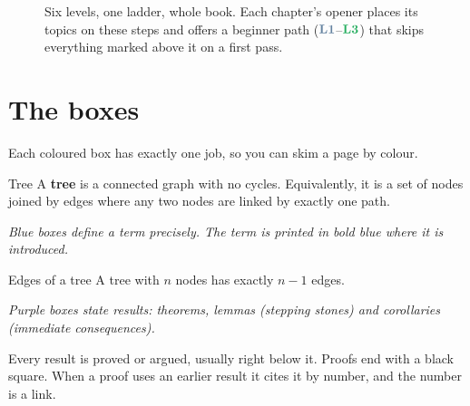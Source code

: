 \begin{figure}[H]
\centering
{}
\caption*{Six levels, one ladder, whole book. Each chapter's opener places its
topics on these steps and offers a beginner path ($\lv1$--$\lv3$) that skips
everything marked above it on a first pass.}
\end{figure}

\section*{The boxes}

Each coloured box has exactly one job, so you can skim a page by colour.

\begin{definition*}{Tree}{}
A \textbf{\textcolor{deepblue}{tree}} is a connected graph with no cycles. Equivalently, it is a set of nodes joined by edges where any two nodes are linked by exactly one path.\par
\emph{Blue boxes define a term precisely. The term is printed in bold blue where it is introduced.}
\end{definition*}

\begin{theorem*}{Edges of a tree}{}
A tree with $n$ nodes has exactly $n-1$ edges.\par
\emph{Purple boxes state results: theorems, lemmas (stepping stones) and corollaries (immediate consequences).}
\end{theorem*}

\begin{proofbox}
Every result is proved or argued, usually right below it. Proofs end with a black square. When a proof uses an earlier result it cites it by number, and the number is a link.
\end{proofbox}

